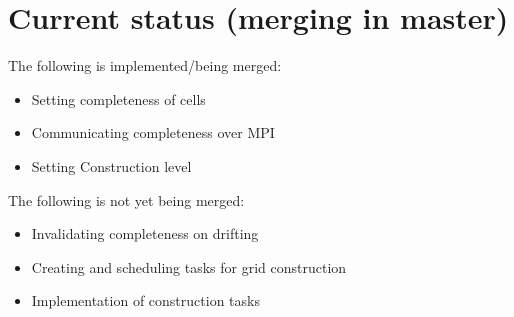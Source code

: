 \section{Current status (merging in master)}
The following is implemented/being merged:
\begin{itemize}
    \item Setting completeness of cells
    \item Communicating completeness over MPI
    \item Setting Construction level
\end{itemize}
The following is not yet being merged:
\begin{itemize}
    \item Invalidating completeness on drifting
    \item Creating and scheduling tasks for grid construction
    \item Implementation of construction tasks
\end{itemize}